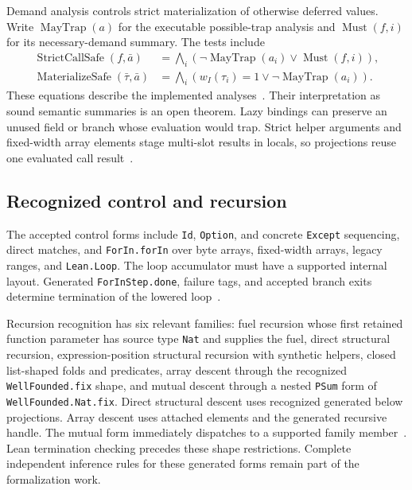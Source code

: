 \documentclass[11pt]{article}
\newcommand{\code}[1]{\texttt{#1}}
\begin{document}
Demand analysis controls strict materialization of otherwise deferred values.  Write $\operatorname{MayTrap}(a)$ for the executable possible-trap analysis and $\operatorname{Must}(f,i)$ for its necessary-demand summary.  The tests include
\begin{align*}
\operatorname{StrictCallSafe}(f,\bar a)
  &=\bigwedge_i(\neg\operatorname{MayTrap}(a_i)\lor\operatorname{Must}(f,i)),\\
\operatorname{MaterializeSafe}(\bar\tau,\bar a)
  &=\bigwedge_i(w_I(\tau_i)=1\lor\neg\operatorname{MayTrap}(a_i)).
\end{align*}
These equations describe the implemented analyses~\cite{demand}.  Their interpretation as sound semantic summaries is an open theorem.  Lazy bindings can preserve an unused field or branch whose evaluation would trap.  Strict helper arguments and fixed-width array elements stage multi-slot results in locals, so projections reuse one evaluated call result~\cite{storage,extract}.

\subsection{Recognized control and recursion}

The accepted control forms include \code{Id}, \code{Option}, and concrete \code{Except} sequencing, direct matches, and \code{ForIn.forIn} over byte arrays, fixed-width arrays, legacy ranges, and \code{Lean.Loop}.  The loop accumulator must have a supported internal layout.  Generated \code{ForInStep.done}, failure tags, and accepted branch exits determine termination of the lowered loop~\cite{patterns,extract}.

Recursion recognition has six relevant families: fuel recursion whose first retained function parameter has source type \code{Nat} and supplies the fuel, direct structural recursion, expression-position structural recursion with synthetic helpers, closed list-shaped folds and predicates, array descent through the recognized \code{WellFounded.fix} shape, and mutual descent through a nested \code{PSum} form of \code{WellFounded.Nat.fix}.  Direct structural descent uses recognized generated below projections.  Array descent uses attached elements and the generated recursive handle.  The mutual form immediately dispatches to a supported family member~\cite{structural,extract}.  Lean termination checking precedes these shape restrictions.  Complete independent inference rules for these generated forms remain part of the formalization work.
\end{document}
